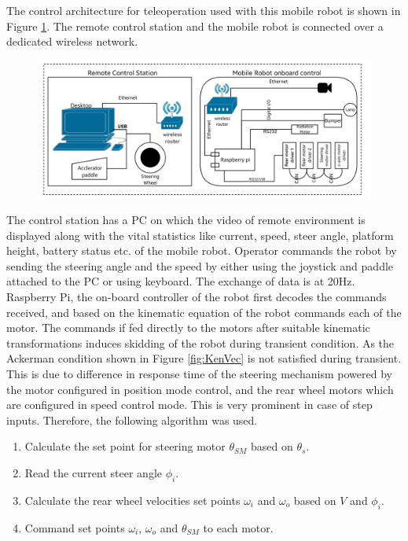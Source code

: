 \documentclass[12pt,a4paper, notitlepage]{article}
\begin{document}
	 The control architecture for teleoperation used with this mobile robot is shown in Figure \ref{fig:ControlBlockDiag}.  The remote control station and  the mobile robot is connected  over a dedicated wireless network.
	\begin{figure}[ht]
		\includegraphics[width=\linewidth,keepaspectratio]{fig/controlblock}
		\label{fig:ControlBlockDiag} 
	\end{figure}
	 The control station has a PC on which the video of  remote environment is displayed along with the vital statistics like current, speed, steer angle, platform height, battery status etc. of the mobile robot. Operator commands the robot by sending the steering angle and the speed by either using the joystick and paddle attached to the PC or using  keyboard. The exchange of data is at 20Hz. Raspberry Pi, the on-board controller of the robot first decodes the commands received, and based on the kinematic equation of the robot commands each of the motor.  The commands if fed directly to the motors after suitable kinematic transformations induces skidding of the robot during transient condition.  As the Ackerman condition shown in Figure \ref{fig:KenVec} is not satisfied during transient. This is due to difference in response time of the steering mechanism powered by the motor configured in position mode control, and the rear wheel motors which are configured in speed control mode.  This is very prominent in  case of step inputs. Therefore, the following algorithm was used.
	\begin{enumerate}
		\item Calculate the set point for steering motor $\theta_{SM} $ based on $\theta_s$. 
		\item Read the current steer  angle $\phi_{i}$.
		\item Calculate the rear wheel velocities set points $\omega_{i}$ and $\omega_{o}$ based on  $V$ and $\phi_{i}$.		
		\item Command  set points $\omega_{i}$, $\omega_{o}$ and $\theta_{SM} $ to each motor. 
	\end{enumerate} 
\end{document}
